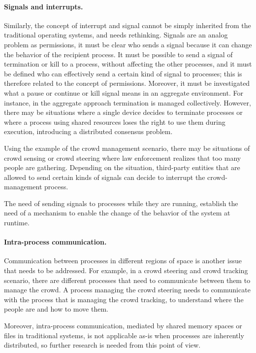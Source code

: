 \documentclass[12pt, a4paper]{article}
\begin{document}
\paragraph{Signals and interrupts.}
Similarly, the concept of interrupt and signal cannot be simply inherited from the traditional operating systems,
and needs rethinking.
%
Signals are an analog problem as permissions, it must be clear who sends a signal because it can
change the behavior of the recipient process.
%
It must be possible to send a signal of termination or kill to a process,
without affecting the other processes,
and it must be defined who can effectively send a certain kind of signal to processes;
this is therefore related to the concept of permissions.
%
Moreover,
it must be investigated what a pause or continue or kill signal means in an aggregate environment.
%
For instance,
in the aggregate approach termination is managed collectively.
%
However,
there may be situations where a single device decides to terminate processes or where a process using shared
resources loses the right to use them during execution,
introducing a distributed consensus problem.

Using the example of the crowd management scenario,
there may be situations of crowd sensing or crowd steering where law enforcement realizes that too many people are gathering.
%
Depending on the situation,
third-party entities that are allowed to send certain kinds of signals can decide to interrupt the crowd-management process.

The need of sending signals to processes while they are running,
establish the need of a mechanism to enable the change of the behavior of the system at runtime.

\paragraph{Intra-process communication.}
Communication between processes in different regions of space is another issue that needs to be addressed.
%
For example,
in a crowd steering and crowd tracking scenario,
there are different processes that need to communicate between them to manage the crowd.
%
A process managing the crowd steering needs to communicate with the process that is managing the crowd tracking,
to understand where the people are and how to move them.

Moreover, intra-process communication,
mediated by shared memory spaces or files in traditional systems,
is not applicable as-is when processes are inherently distributed,
so further research is needed from this point of view.
\end{document}
